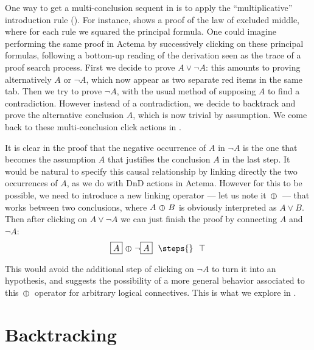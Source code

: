 One way to get a multi-conclusion sequent in  is to apply the
``multiplicative'' introduction rule {} (). For
instance,  shows a proof of the law of excluded middle, where for
each rule we squared the principal formula.
One could imagine performing the same proof in Actema by successively clicking
on these principal formulas, following a bottom-up reading of the  derivation seen as the trace of a proof search process. First we decide
to prove $A \lor \neg A$: this amounts to proving alternatively $A$ or $\neg
A$, which now appear as two separate red items in the same tab. Then we try to
prove $\neg A$, with the usual method of supposing $A$ to find a contradiction.
However instead of a contradiction, we decide to backtrack and prove the
alternative conclusion $A$, which is now trivial by assumption. We come back to
these multi-conclusion click actions in .

It is clear in the proof that the negative occurrence of $A$ in $\neg A$ is the
one that becomes the assumption $A$ that justifies the conclusion $A$ in the
last step. It would be natural to specify this causal relationship by linking
directly the two occurrences of $A$, as we do with DnD actions in Actema.
However for this to be possible, we need to introduce a new linking operator ---
let us note it $\operatorname{\,\varobar\,}$ --- that works between two conclusions, where $A \operatorname{\,\varobar\,} B$
is obviously interpreted as $A \lor B$. Then after clicking on $A \lor \neg A$
we can just finish the proof by connecting $A$ and $\neg A$:
$$\select{A} \para \neg \select{A} ~~\steps{}~~ \top$$

This would avoid the additional step of clicking on $\neg A$ to turn it into an
hypothesis, and suggests the possibility of a more general behavior
associated to this $\operatorname{\,\varobar\,}$ operator for arbitrary logical connectives. This is
what we explore in .

\section{Backtracking}



